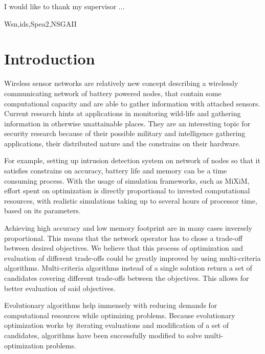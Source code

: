 \documentclass[12pt,oneside]{fithesis2}
\begin{document}
\FrontMatter
\ThesisTitlePage
\begin{ThesisDeclaration}
\DeclarationText
\AdvisorName
\end{ThesisDeclaration}
\begin{ThesisThanks}
I would like to thank my supervisor ...
\end{ThesisThanks}
\begin{ThesisAbstract}
\end{ThesisAbstract}
 
\begin{ThesisKeyWords}
Wsn,ids,Spea2,NSGAII
\end{ThesisKeyWords}

\tableofcontents %

\MainMatter
\chapter{Introduction}
\label{chap:intro}
Wireless sensor networks are relatively new concept describing a wirelessly communicating network of battery powered nodes, that contain some computational capacity and are able to gather information with attached sensors. Current research hints at applications in monitoring wild-life and gathering information in otherwise unattainable places. They are an interesting topic for security research because of their possible military and intelligence gathering applications, their distributed nature and the constrains on their hardware. 

For example, setting up intrusion detection system on network of nodes so that it satisfies constrains on accuracy, battery life and memory can be a time consuming process. With the usage of simulation frameworks, such as MiXiM, effort spent on optimization is directly proportional to invested computational resources, with realistic simulations taking up to several hours of processor time, based on its parameters.

Achieving high accuracy and low memory footprint are in many cases inversely proportional. This means that the network operator has to chose a trade-off between desired objectives.  We believe that this process of optimization and evaluation of different trade-offs could be greatly improved by using multi-criteria algorithms. Multi-criteria algorithms instead of a single solution return a set of candidates covering different trade-offs between the objectives. This allows for better evaluation of said objectives.

Evolutionary algorithms help immensely with reducing demands for computational resources while optimizing problems. Because evolutionary optimization works by iterating evaluations and modification of a set of candidates, algorithms have been successfully modified to solve multi-optimization problems.
\end{document}
